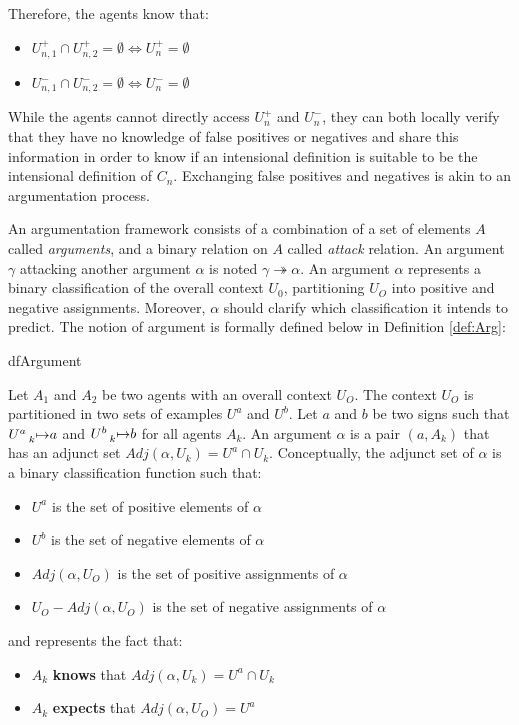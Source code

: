 Therefore, the agents know that:

\begin{itemize}
    \item $U^{+}_{n,1} \cap U^{+}_{n,2} = \emptyset \Leftrightarrow U^{+}_{n} = \emptyset$
    \item $U^{-}_{n,1} \cap U^{-}_{n,2} = \emptyset \Leftrightarrow U^{-}_{n} = \emptyset$
\end{itemize}

While the agents cannot directly access $U^{+}_{n}$ and $U^{-}_{n}$, they can both locally verify that they have no knowledge of false positives or negatives and share this information in order to know if an intensional definition is suitable to be the intensional definition of $C_{n}$. Exchanging false positives and negatives is akin to an argumentation process.

An argumentation framework consists of a combination of a set of elements $A$ called \emph{arguments}, and a binary relation on $A$ called \emph{attack} relation. An argument $\gamma$ attacking another argument $\alpha$ is noted $\gamma \twoheadrightarrow \alpha$. An argument $\alpha$ represents a binary classification of the overall context $U_{0}$, partitioning $U_{O}$ into positive and negative assignments. Moreover, $\alpha$ should clarify which classification it intends to predict. The notion of argument is formally defined below in Definition \ref{def:Arg}:

\begin{restatable}[Argument]{df}{Argument}
\label{def:Arg}

Let $A_{1}$ and $A_{2}$ be two agents with an overall context $U_{O}$. The context $U_{O}$ is partitioned in two sets of examples $U^{a}$ and $U^{b}$. Let $a$ and $b$ be two signs such that $U^{a} \prescript{}{k}{\mapsto} a$ and $U^{b} \prescript{}{k}{\mapsto} b$ for all agents $A_{k}$. An argument $\alpha$ is a pair $(a,A_{k})$ that has an adjunct set $Adj(\alpha,U_{k}) = U^{a} \cap U_{k}$. Conceptually, the adjunct set of $\alpha$ is a binary classification function such that:

\begin{itemize}
    \item $U^{a}$ is the set of positive elements of $\alpha$
    \item $U^{b}$ is the set of negative elements of $\alpha$
    \item $Adj(\alpha,U_{O})$ is the set of positive assignments of $\alpha$
    \item $U_{O} - Adj(\alpha,U_{O})$ is the set of negative assignments of $\alpha$
\end{itemize}

and represents the fact that:

\begin{itemize}
    \item $A_{k}$ \textbf{knows} that $Adj(\alpha,U_{k}) = U^{a} \cap U_{k}$
    \item $A_{k}$ \textbf{expects} that $Adj(\alpha,U_{O}) = U^{a}$
\end{itemize}

\end{restatable}

